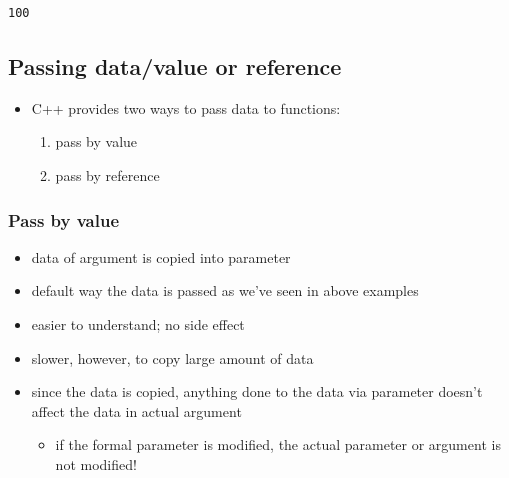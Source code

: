 \documentclass[11pt]{article}
\makeatletter
\providecommand{\tightlist}{%
      \setlength{\itemsep}{0pt}\setlength{\parskip}{0pt}}
\newcommand{\boxspacing}{\kern\kvtcb@left@rule\kern\kvtcb@boxsep}
\newcommand{\prompt}[4]{
        {\ttfamily\llap{{\color{#2}[#3]:\hspace{3pt}#4}}\vspace{-\baselineskip}}
    }
\makeatother
\begin{document}
            \begin{tcolorbox}[breakable, size=fbox, boxrule=.5pt, pad at break*=1mm, opacityfill=0]
\prompt{Out}{outcolor}{18}{\boxspacing}
\begin{Verbatim}[commandchars=\\\{\}]
100
\end{Verbatim}
\end{tcolorbox}
        
    \hypertarget{passing-datavalue-or-reference}{%
\subsection{Passing data/value or
reference}\label{passing-datavalue-or-reference}}

\begin{itemize}
\tightlist
\item
  C++ provides two ways to pass data to functions:

  \begin{enumerate}
  \def\labelenumi{\arabic{enumi}.}
  \tightlist
  \item
    pass by value
  \item
    pass by reference
  \end{enumerate}
\end{itemize}

\hypertarget{pass-by-value}{%
\subsubsection{Pass by value}\label{pass-by-value}}

\begin{itemize}
\tightlist
\item
  data of argument is copied into parameter
\item
  default way the data is passed as we've seen in above examples
\item
  easier to understand; no side effect
\item
  slower, however, to copy large amount of data
\item
  since the data is copied, anything done to the data via parameter
  doesn't affect the data in actual argument

  \begin{itemize}
  \tightlist
  \item
    if the formal parameter is modified, the actual parameter or
    argument is not modified!
  \end{itemize}
\end{itemize}
\end{document}

